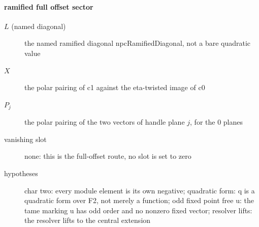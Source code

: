 \paragraph{ramified full offset sector}
\begin{description}
\item[$L$ (named diagonal)] the named ramified diagonal npcRamifiedDiagonal, not a bare quadratic value
\item[$X$] the polar pairing of c1 against the eta-twisted image of c0
\item[$P_j$] the polar pairing of the two vectors of handle plane $j$, for the 0 planes
\item[vanishing slot] none: this is the full-offset route, no slot is set to zero
\item[hypotheses] char two: every module element is its own negative; quadratic form: q is a quadratic form over F2, not merely a function; odd fixed point free u: the tame marking u has odd order and no nonzero fixed vector; resolver lifts: the resolver lifts to the central extension
\end{description}
